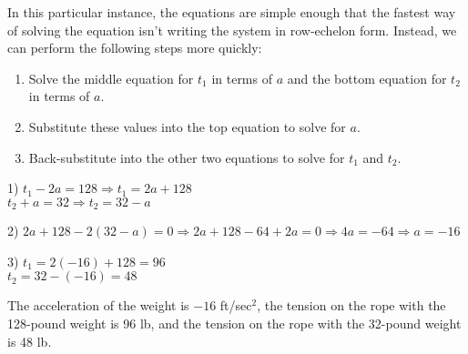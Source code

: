 \documentclass[12pt]{letter}
\newcommand{\fp}[1]{\left({#1}\right)} %
\def\then{\Rightarrow}
\newcommand{\?}{\stackrel{?}{=}}
\begin{document}
	In this particular instance, the equations are simple enough that the fastest way of solving the equation isn't writing the system in row-echelon form. Instead, we can perform the following steps more quickly: \begin{enumerate}[1)]
		\item Solve the middle equation for $t_1$ in terms of $a$ and the bottom equation for $t_2$ in terms of $a$.
		\item Substitute these values into the top equation to solve for $a$.
		\item Back-substitute into the other two equations to solve for $t_1$ and $t_2$.
	\end{enumerate}

	1) $t_1 - 2a = 128 \then t_1 = 2a + 128$ \\ $t_2 + a = 32 \then t_2 = 32 - a$
	
	2) $2a + 128 - 2\fp{32 - a} = 0 \then 2a + 128 - 64 + 2a = 0 \then 4a = -64 \then a = -16$
	
	3) $t_1 = 2(-16) + 128 = 96$ \\ $t_2 = 32 - (-16) = 48$
	
	The acceleration of the weight is $-16$ ft/sec$^2$, the tension on the rope with the 128-pound weight is 96 lb, and the tension on the rope with the 32-pound weight is 48 lb.
	
	\vfill %
	
	
	
\end{document}

